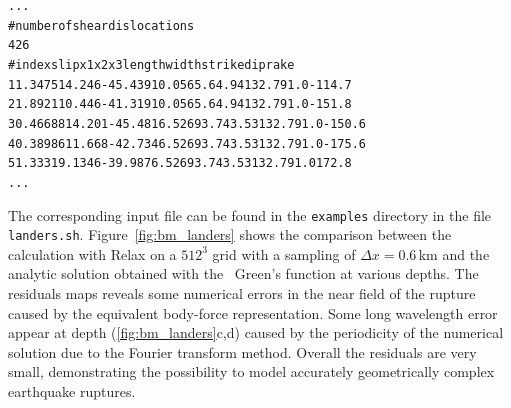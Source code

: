 \documentclass[10pt]{article}
\begin{document}
\begin{alltt}
...
# number of shear dislocations
{\color{orange}426}
# index slip x1 x2 x3 length width strike dip rake
{\color{orange}1 1.3475 14.246 -45.439 10.056 5.6 4.94 132.7 91.0 -114.7
2 1.8921 10.446 -41.319 10.056 5.6 4.94 132.7 91.0 -151.8
3 0.46688 14.201 -45.481 6.5269 3.74 3.53 132.7 91.0 -150.6
4 0.38986 11.668 -42.734 6.5269 3.74 3.53 132.7 91.0 -175.6
5 1.3331 9.1346 -39.987 6.5269 3.74 3.53 132.7 91.0 172.8}
...
\end{alltt}
The corresponding input file can be found in the \verb'examples' directory in the file \verb'landers.sh'. Figure~\ref{fig:bm_landers} shows the comparison between the calculation with Relax on a $512^3$ grid with a sampling of $\Delta x=0.6\,$km and the analytic solution obtained with the~\cite{okada92} Green's function at various depths. The residuals maps reveals some numerical errors in the near field of the rupture caused by the equivalent body-force representation. Some long wavelength error appear at depth (\ref{fig:bm_landers}c,d) caused by the periodicity of the numerical solution due to the Fourier transform method. Overall the residuals are very small, demonstrating the possibility to model accurately geometrically complex earthquake ruptures.
\end{document}
